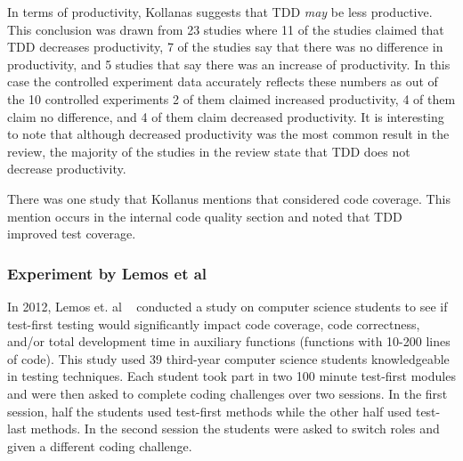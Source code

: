 \documentclass{sig-alternate}
\begin{document}
In terms of productivity, Kollanas suggests that TDD \textit{may} be less productive. This conclusion was drawn from 23 studies where 11 of the studies claimed that TDD decreases productivity, 7 of the studies say that there was no difference in productivity, and 5 studies that say there was an increase of productivity.  In this case the controlled experiment data accurately reflects these numbers as out of the 10 controlled experiments 2 of them claimed increased productivity, 4 of them claim no difference, and 4 of them claim decreased productivity.  It is interesting to note that although decreased productivity was the most common result in the review, the majority of the studies in the review state that TDD does not decrease productivity.
 
There was one study that Kollanus mentions that considered code coverage.  This mention occurs in the internal code quality section and noted that TDD improved test coverage.



\subsubsection{Experiment by Lemos et al} 

In 2012, Lemos et. al ~\cite{Lemos:2012} conducted a study on computer science students to see if test-first testing would significantly impact code coverage,  code correctness, and/or total development time in auxiliary functions (functions with 10-200 lines of code).   This study used 39 third-year computer science students knowledgeable in testing techniques. Each student took part in  two 100 minute test-first modules and were then asked to complete coding challenges over two sessions.  In the first session, half the students used test-first methods while the other half used test-last methods.  In the second session the students were asked to switch roles and given a different coding challenge.
\end{document}
